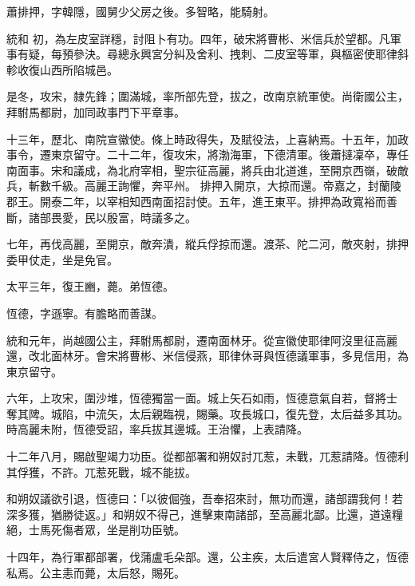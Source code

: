 \begin{pinyinscope}
 蕭排押，字韓隱，國舅少父房之後。多智略，能騎射。



 統和
 初，為左皮室詳穩，討阻卜有功。四年，破宋將曹彬、米信兵於望都。凡軍事有疑，每預參決。尋總永興宮分糾及舍利、拽刺、二皮室等軍，與樞密使耶律斜軫收復山西所陷城邑。



 是冬，攻宋，隸先鋒；圍滿城，率所部先登，拔之，改南京統軍使。尚衛國公主，拜駙馬都尉，加同政事門下平章事。



 十三年，歷北、南院宣徽使。條上時政得失，及賦役法，上喜納焉。十五年，加政事令，遷東京留守。二十二年，復攻宋，將渤海軍，下德清軍。後蕭撻凜卒，專任南面事。宋和議成，為北府宰相，聖宗征高麗，將兵由北道進，至開京西嶺，破敵兵，斬數千級。高麗王詢懼，奔平州。
 排押入開京，大掠而還。帝嘉之，封蘭陵郡王。開泰二年，以宰相知西南面招討使。五年，進王東平。排押為政寬裕而善斷，諸部畏愛，民以殷富，時議多之。



 七年，再伐高麗，至開京，敵奔潰，縱兵俘掠而還。渡茶、陀二河，敵夾射，排押委甲仗走，坐是免官。



 太平三年，復王豳，薨。弟恆德。



 恆德，字遜寧。有膽略而善謀。



 統和元年，尚越國公主，拜駙馬都尉，遷南面林牙。從宣徽使耶律阿沒里征高麗還，改北面林牙。會宋將曹彬、米信侵燕，耶律休哥與恆德議軍事，多見信用，為東京留守。



 六年，上攻宋，圍沙堆，恆德獨當一面。城上矢石如雨，恆德意氣自若，督將士
 奪其陴。城陷，中流矢，太后親臨視，賜藥。攻長城口，復先登，太后益多其功。時高麗未附，恆德受詔，率兵拔其邊城。王治懼，上表請降。



 十二年八月，賜啟聖竭力功臣。從都部署和朔奴討兀惹，未戰，兀惹請降。恆德利其俘獲，不許。兀惹死戰，城不能拔。



 和朔奴議欲引退，恆德曰：「以彼倔強，吾奉招來討，無功而還，諸部謂我何！若深多獲，猶勝徒返。」和朔奴不得己，進擊東南諸部，至高麗北鄙。比還，道遠糧絕，士馬死傷者眾，坐是削功臣號。



 十四年，為行軍都部署，伐蒲盧毛朵部。還，公主疾，太后遣宮人賢釋侍之，恆德私焉。公主恚而薨，太后怒，賜死。




\end{pinyinscope}
